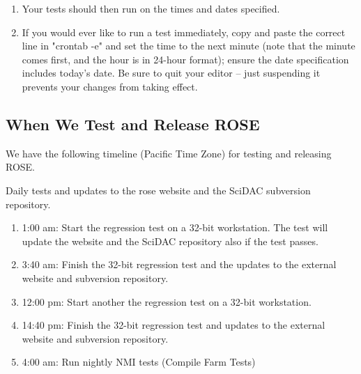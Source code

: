 \begin{enumerate}
\begin{enumerate}
\begin{enumerate}
         \item If other people are using the machine you are running tests on, be
               sure to coordinate the time your scripts are going to run with them.
         \item See "man crontab" for the format of the time and date specification.
         \item The command to use is (all one line):
\begin{verbatim}
           cd <your ROSE source tree>/scripts && \
           ./roseFreshTest ./roseFreshTestStub-<your stub name>.sh \
           <extra configure options>
         Where <extra configure options> are things like
         --with-C\_DEBUG=..., etc.
\end{verbatim}
      \end{enumerate}
   \end{enumerate}
   \item Your tests should then run on the times and dates specified.
   \item If you would ever like to run a test immediately, copy and paste the
   correct line in "crontab -e" and set the time to the next minute (note
   that the minute comes first, and the hour is in 24-hour format); ensure
   the date specification includes today's date.  Be sure to quit your
   editor -- just suspending it prevents your changes from taking effect.
\end{enumerate}

\subsection{When We Test and Release ROSE}
We have the following timeline (Pacific Time Zone) for testing and 
releasing ROSE.

Daily tests and updates to the rose website and the SciDAC subversion
repository.
\begin{enumerate}
\item 1:00 am: Start the regression test on a 32-bit workstation. The test
will update the website and the SciDAC repository also if the test
passes.
\item 3:40 am: Finish the 32-bit regression test and the updates to the external website
and subversion repository.
\item 12:00 pm: Start another the regression test on a 32-bit workstation.
\item 14:40 pm: Finish the 32-bit regression test and updates to the external website
and subversion repository.
\item 4:00 am: Run nightly NMI tests (Compile Farm Tests)
\end{enumerate}

